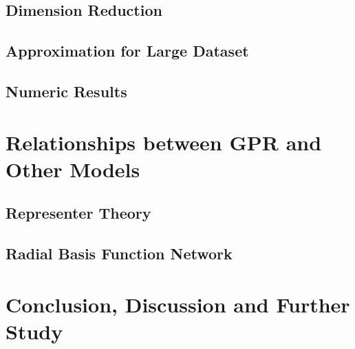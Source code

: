 \documentclass[12pt,a4paper]{article}
\theoremstyle{definition}
\numberwithin{equation}{section}
\begin{document}
\subsection{Dimension Reduction}

\subsection{Approximation for Large Dataset}

\subsection{Numeric Results}

\newpage
\section{Relationships between GPR and Other Models}

\subsection{Representer Theory}

\subsection{Radial Basis Function Network}

\newpage
\section{Conclusion, Discussion and Further Study}
\end{document}
